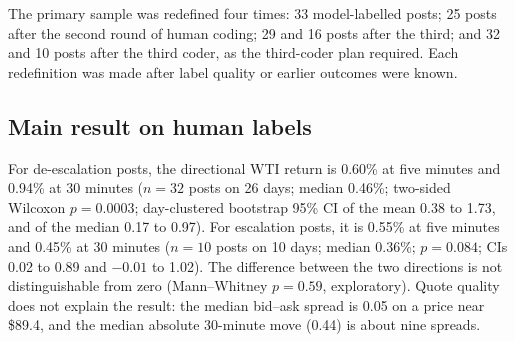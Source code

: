 \documentclass[11pt]{article}
\begin{document}
\noindent The primary sample was redefined four times: 33 model-labelled posts; 25 posts after the second round of human coding; 29 and 16 posts after the third; and 32 and 10 posts after the third coder, as the third-coder plan required. Each redefinition was made after label quality or earlier outcomes were known.

\subsection{Main result on human labels}

For de-escalation posts, the directional WTI return is 0.60\% at five minutes and 0.94\% at 30 minutes ($n = 32$ posts on 26 days; median 0.46\%; two-sided Wilcoxon $p = 0.0003$; day-clustered bootstrap 95\% CI of the mean 0.38 to 1.73, and of the median 0.17 to 0.97). For escalation posts, it is 0.55\% at five minutes and 0.45\% at 30 minutes ($n = 10$ posts on 10 days; median 0.36\%; $p = 0.084$; CIs 0.02 to 0.89 and $-0.01$ to 1.02). The difference between the two directions is not distinguishable from zero (Mann--Whitney $p = 0.59$, exploratory). Quote quality does not explain the result: the median bid--ask spread is 0.05 on a price near \$89.4, and the median absolute 30-minute move (0.44) is about nine spreads.
\end{document}
